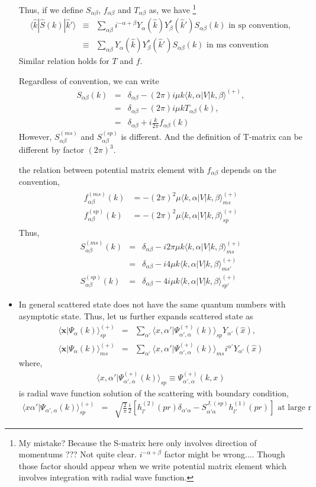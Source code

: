 \documentclass[10pt]{article}
\def\bm{\boldsymbol}
\newcommand{\bea}{\begin{eqnarray}}
\newcommand{\eea}{\end{eqnarray}}
\newcommand{\no}{\nonumber \\}
\def\vx{{\bm x}}
\def\la{\langle}
\def\ra{\rangle}
\begin{document}
\begin{itemize}
Thus, if we define $S_{\alpha\beta}$, $f_{\alpha\beta}$ and
$T_{\alpha\beta}$ as, we have
\footnote{
My mistake?
Because the S-matrix here only involves direction of
momentums  
??? Not quite clear. $i^{-\alpha+\beta}$ factor
might be wrong....
Though those factor should appear when we write 
potential matrix element which involves integration with
radial wave function.
}
\bea
\la \hat{k}|\hat{S}(k)|\hat{k}'\ra&\equiv&
      \sum_{\alpha\beta} i^{-\alpha+\beta}
      Y_{\alpha}(\hat{k})Y_{\beta}^*(\hat{k}') S_{\alpha\beta}(k)
      \mbox{ in sp convention}
      ,\no
      &\equiv&
      \sum_{\alpha\beta}
      Y_{\alpha}(\hat{k})Y_{\beta}^*(\hat{k}') S_{\alpha\beta}(k)
      \mbox{ in ms convention}
\eea
Similar relation holds for $T$ and $f$.

Regardless of convention,  we can write 
\begin{equation}
\boxed{
\begin{array}{ccl}
S_{\alpha\beta}(k)
&=&\delta_{\alpha\beta}-(2\pi)i \mu k 
        \la k,\alpha| V| k,\beta\ra^{(+)},\\
&=&\delta_{\alpha\beta} -(2\pi)i \mu k T_{\alpha\beta}(k),\\
&=&\delta_{\alpha\beta}+ i\frac{k}{2\pi} f_{\alpha\beta}(k)
\end{array}
}
\end{equation}
However, $S_{\alpha\beta}^{(ms)}$
and $S_{\alpha\beta}^{(sp)}$ is different.
And the definition of T-matrix can be different by factor $(2\pi)^3$.

the relation between potential matrix
element with $f_{\alpha\beta}$ depends on the convention,
\bea
\boxed{
\begin{array}{cl}
f_{\alpha\beta}^{(ms)}(k)
&=-(2\pi)^2\mu \la k,\alpha|V|k,\beta\ra^{(+)}_{ms} \\
f_{\alpha\beta}^{(sp)}(k)
&=-(2\pi)^2\mu \la k,\alpha|V|k,\beta\ra^{(+)}_{sp}
\end{array}
}
\eea
Thus,
\bea
S_{\alpha\beta}^{(ms)}(k)
&=&\delta_{\alpha\beta}
  -i2\pi \mu k \la k,\alpha|V|k,\beta\ra^{(+)}_{ms}\no
&=&\delta_{\alpha\beta}
  -i4 \mu k \la k,\alpha|V|k,\beta\ra^{(+)}_{ms'}\no
S_{\alpha\beta}^{(sp)}(k)&=&\delta_{\alpha\beta}
  -4 i \mu k \la k,\alpha|V|k,\beta\ra^{(+)}_{sp'} 
\eea



\item In general scattered state does not have the same
quantum numbers with asymptotic state.
Thus, let us further expands scattered state as
\bea
\la \vx |\Psi_\alpha(k)\ra^{(+)}_{sp}
&=&\sum_{\alpha'} 
\la x,\alpha'|\Psi^{(+)}_{\alpha',\alpha}(k)\ra_{sp}
Y_{\alpha'}(\hat{x}),\no
\la \vx |\Psi_\alpha(k)\ra^{(+)}_{ms}
&=&\sum_{\alpha'} 
\la x,\alpha'|\Psi^{(+)}_{\alpha',\alpha}(k)\ra_{ms}
i^{\alpha'}Y_{\alpha'}(\hat{x})
\eea
where,
\bea
\la x,\alpha'|\Psi^{(+)}_{\alpha',\alpha}(k)\ra_{sp}
\equiv \Psi^{(+)}_{\alpha',\alpha}(k,x)
\eea
is radial wave function solution 
of the scattering with 
boundary condition,
\bea
\la x \alpha'|\Psi_{\alpha',\alpha}(k)\ra^{(+)}_{sp}
&=&\sqrt{\frac{2}{\pi}}\frac{i}{2}
                  [h^{(2)}_{l'}(pr)\delta_{\alpha'\alpha}
                      -S^{J,(sp)}_{\alpha'\alpha} 
                      h^{(1)}_{l'}(pr)] 
                      \mbox{ at large r}
\eea


\end{itemize}
\end{document}
